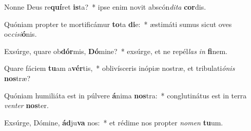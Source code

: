 \item Nonne Deus re\textbf{quí}ret \textbf{is}ta?~* ipse enim novit abscón\textit{di}\textit{ta} \textbf{cor}dis.
\item Quóniam propter te mortificámur \textbf{to}ta \textbf{di}e:~* æstimáti sumus sicut oves oc\textit{ci}\textit{si}\textbf{ó}nis.
\item Exsúrge, quare ob\textbf{dór}mis, \textbf{Dó}mine?~* exsúrge, et ne repél\textit{las} \textit{in} \textbf{fi}nem.
\item Quare fáciem \textbf{tu}am a\textbf{vér}tis,~* oblivísceris inópiæ nostræ, et tribulati\textit{ó}\textit{nis} \textbf{nos}træ?
\item Quóniam humiliáta est in púlvere \textbf{á}nima \textbf{nos}tra:~* conglutinátus est in terra \textit{ven}\textit{ter} \textbf{nos}ter.
\item Exsúrge, Dómine, \textbf{ád}ju\textbf{va} nos:~* et rédime nos propter \textit{no}\textit{men} \textbf{tu}um.
